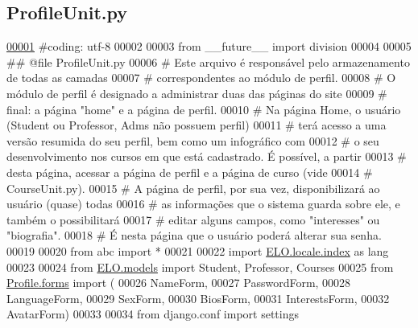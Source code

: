 \hypertarget{ProfileUnit_8py_source}{}\subsection{Profile\+Unit.\+py}
\label{ProfileUnit_8py_source}

\begin{DoxyCode}
\hypertarget{ProfileUnit_8py_source_l00001}{}\hyperlink{namespaceProfile_1_1ProfileUnit}{00001} \textcolor{comment}{#coding: utf-8}
00002 
00003 \textcolor{keyword}{from} \_\_future\_\_ \textcolor{keyword}{import} division
00004 
00005 \textcolor{comment}{## @file ProfileUnit.py}
00006 \textcolor{comment}{#   Este arquivo é responsável pelo armazenamento de todas as camadas }
00007 \textcolor{comment}{# correspondentes ao módulo de perfil. }
00008 \textcolor{comment}{#   O módulo de perfil é designado a administrar duas das páginas do site}
00009 \textcolor{comment}{# final: a página "home" e a página de perfil.}
00010 \textcolor{comment}{#   Na página Home, o usuário (Student ou Professor, Adms não possuem perfil)}
00011 \textcolor{comment}{# terá acesso a uma versão resumida do seu perfil, bem como um infográfico com}
00012 \textcolor{comment}{# o seu desenvolvimento nos cursos em que está cadastrado. É possível, a partir}
00013 \textcolor{comment}{# desta página, acessar a página de perfil e a página de curso (vide }
00014 \textcolor{comment}{# CourseUnit.py).}
00015 \textcolor{comment}{#   A página de perfil, por sua vez, disponibilizará ao usuário (quase) todas}
00016 \textcolor{comment}{# as informações que o sistema guarda sobre ele, e também o possibilitará }
00017 \textcolor{comment}{# editar alguns campos, como "interesses" ou "biografia".}
00018 \textcolor{comment}{# É nesta página que o usuário poderá alterar sua senha.}
00019 
00020 \textcolor{keyword}{from} abc \textcolor{keyword}{import} *
00021 
00022 \textcolor{keyword}{import} \hyperlink{namespaceELO_1_1locale_1_1index}{ELO.locale.index} \textcolor{keyword}{as} lang
00023 
00024 \textcolor{keyword}{from} \hyperlink{namespaceELO_1_1models}{ELO.models} \textcolor{keyword}{import} Student, Professor, Courses
00025 \textcolor{keyword}{from} \hyperlink{namespaceProfile_1_1forms}{Profile.forms} \textcolor{keyword}{import} (
00026     NameForm, 
00027     PasswordForm,
00028     LanguageForm,
00029     SexForm,
00030     BiosForm,
00031     InterestsForm,
00032     AvatarForm)
00033 
00034 \textcolor{keyword}{from} django.conf \textcolor{keyword}{import} settings

\end{DoxyCode}
